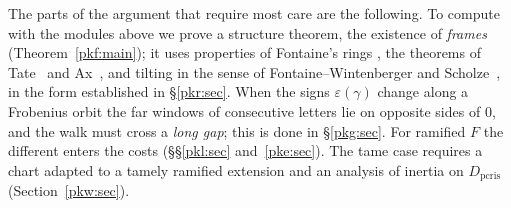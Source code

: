 \documentclass[10pt]{amsart}
\theoremstyle{definition}
\theoremstyle{remark}
\begin{document}
The parts of the argument that require most care are the following. To compute with the modules
above we prove a structure theorem, the existence of \emph{frames} (Theorem~\ref{pkf:main}); it
uses properties of Fontaine's rings \cite{pkfColmez98,pkfFontaineII,pkfFontaineIII}, the theorems
of Tate~\cite{pklTate67} and Ax~\cite{pkfAx70}, and tilting in the sense of Fontaine--Wintenberger
and Scholze~\cite{pkfWintenberger83,pkfScholze12}, in the form established in
\S\ref{pkr:sec}. When the signs $\varepsilon(\gamma)$ change along a Frobenius orbit the
far windows of consecutive letters lie on opposite sides of $0$, and the walk must cross a
\emph{long gap}; this is done in \S\ref{pkg:sec}. For ramified $F$ the different enters
the costs (\S\S\ref{pkl:sec} and~\ref{pke:sec}). The tame case requires a chart adapted to a tamely
ramified extension and an analysis of inertia on $D_{\mathrm{pcris}}$ (Section~\ref{pkw:sec}).
\end{document}
